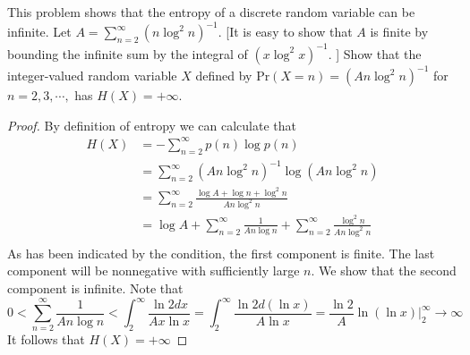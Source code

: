 \begin{exercise}{This problem shows that the entropy of a discrete random variable can be infinite. Let $A = \sum_{n=2}^{\infty} (n \log^{2} n)^{-1}$. [It is easy to show that $A$ is finite by bounding the infinite sum by the integral of $(x \log^{2} x)^{-1}$. ] Show that the integer-valued random variable $X$ defined by $\text{Pr}(X = n) = (An \log^2 n)^{-1}$ for $n = 2, 3, \cdots,$ has $H(X) = +\infty$.}

  \begin{proof}
    By definition of entropy we can calculate that
    \begin{equation}
      \begin{aligned}
        H(X) &= - \sum_{n = 2}^{\infty} p(n)\log p(n) \\
        &= \sum_{n=2}^{\infty} (An\log^2 n)^{-1} \log (An\log^2 n) \\
        &= \sum_{n=2}^{\infty} \frac{\log A + \log n + \log^2 n}{An\log^2 n} \\
        &= \log A + \sum_{n=2}^{\infty} \frac{1}{An\log n} + \sum_{n=2}^{\infty} \frac{\log^2 n}{An\log^2 n} \\
      \end{aligned}
    \end{equation}
    As has been indicated by the condition, the first component is finite. The last component will be nonnegative with sufficiently large $n$. We show that the second component is infinite. Note that
    $$0 <  \sum_{n=2}^{\infty} \frac{1}{An\log n} < \int_{2}^{\infty} \frac{\ln 2 dx}{A x \ln x} = \int_{2}^{\infty} \frac{\ln 2 d(\ln x)}{A \ln x} = \frac{\ln 2}{A} \ln(\ln x) \bigg|_{2}^{\infty} \rightarrow \infty$$
    It follows that $H(X)=+\infty$
  \end{proof}
\end{exercise}